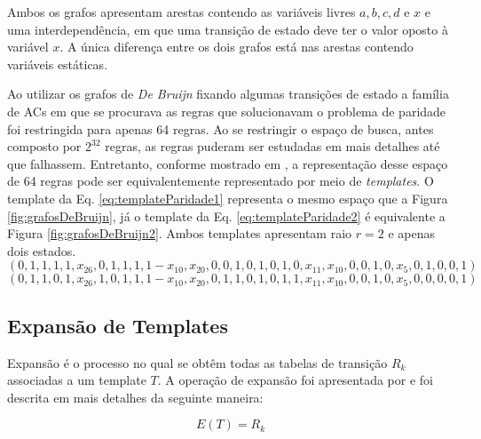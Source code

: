 Ambos os grafos apresentam arestas contendo as variáveis livres $a, b, c, d \text{ e } x$ e uma interdependência, em que uma transição de estado deve ter o valor oposto à variável $x$. A única diferença entre os dois grafos está nas arestas contendo variáveis estáticas.

Ao utilizar os grafos de \textit{De Bruijn} fixando algumas transições de estado a família de ACs em que se procurava as regras que solucionavam o problema de paridade foi restringida para apenas 64 regras. Ao se restringir o espaço de busca, antes composto por $2^{32}$ regras, as regras puderam ser estudadas em mais detalhes até que falhassem. Entretanto, conforme mostrado em \cite{Verardo2014}, a representação desse espaço de 64 regras pode ser equivalentemente representado por meio de \textit{templates}. O template da Eq. \eqref{eq:templateParidade1} representa o mesmo espaço que a Figura \ref{fig:grafosDeBruijn}, já o template da Eq. \eqref{eq:templateParidade2} é equivalente a Figura \ref{fig:grafosDeBruijn2}. Ambos templates apresentam raio $r=2$ e apenas dois estados.
\begin{equation}
\left(0,1,1,1,1,x_{26},0,1,1,1,1-x_{10},x_{20},0,0,1,0,1,0,1,0,x_{11},x_{10},0,0,1,0,x_5,0,1,0,0,1\right)
\label{eq:templateParidade1}
\end{equation}
\begin{equation}
\left(0,1,1,0,1,x_{26},1,0,1,1,1-x_{10},x_{20},0,1,1,0,1,0,1,1,x_{11},x_{10},0,0,1,0,x_5,0,0,0,0,1\right)
\label{eq:templateParidade2}
\end{equation}


\newpage\newpage
\subsection{Expansão de Templates}
Expansão é o processo no qual se obtêm todas as tabelas de transição $R_k$ associadas a um template $T$.
A operação de expansão foi apresentada por  e foi descrita em mais detalhes da seguinte maneira:

\begin{equation}
E(T)=R_k
\end{equation}

